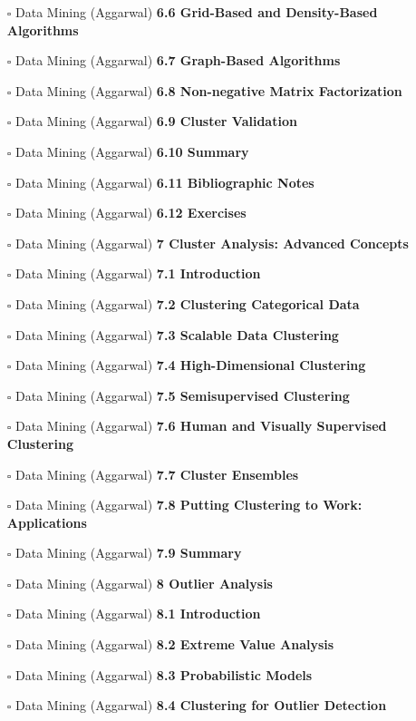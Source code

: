 \documentclass[a4, landscape, 12pt]{article}
\newcommand{\checkbox}{$\square$}%
\begin{document}
\begin{itemize}
{}
\item [\checkbox]  Data Mining (Aggarwal) \textbf{ 6.6 Grid-Based and Density-Based Algorithms
}
\item [\checkbox]  Data Mining (Aggarwal) \textbf{ 6.7 Graph-Based Algorithms
}
\item [\checkbox]  Data Mining (Aggarwal) \textbf{ 6.8 Non-negative Matrix Factorization
}
\item [\checkbox]  Data Mining (Aggarwal) \textbf{ 6.9 Cluster Validation
}
\item [\checkbox]  Data Mining (Aggarwal) \textbf{ 6.10 Summary
}
\item [\checkbox]  Data Mining (Aggarwal) \textbf{ 6.11 Bibliographic Notes
}
\item [\checkbox]  Data Mining (Aggarwal) \textbf{ 6.12 Exercises
}
\item [\checkbox]  Data Mining (Aggarwal) \textbf{ 7 Cluster Analysis: Advanced Concepts
}
\item [\checkbox]  Data Mining (Aggarwal) \textbf{ 7.1 Introduction
}
\item [\checkbox]  Data Mining (Aggarwal) \textbf{ 7.2 Clustering Categorical Data
}
\item [\checkbox]  Data Mining (Aggarwal) \textbf{ 7.3 Scalable Data Clustering
}
\item [\checkbox]  Data Mining (Aggarwal) \textbf{ 7.4 High-Dimensional Clustering
}
\item [\checkbox]  Data Mining (Aggarwal) \textbf{ 7.5 Semisupervised Clustering
}
\item [\checkbox]  Data Mining (Aggarwal) \textbf{ 7.6 Human and Visually Supervised Clustering
}
\item [\checkbox]  Data Mining (Aggarwal) \textbf{ 7.7 Cluster Ensembles
}
\item [\checkbox]  Data Mining (Aggarwal) \textbf{ 7.8 Putting Clustering to Work: Applications
}
\item [\checkbox]  Data Mining (Aggarwal) \textbf{ 7.9 Summary
}
\item [\checkbox]  Data Mining (Aggarwal) \textbf{ 8 Outlier Analysis
}
\item [\checkbox]  Data Mining (Aggarwal) \textbf{ 8.1 Introduction
}
\item [\checkbox]  Data Mining (Aggarwal) \textbf{ 8.2 Extreme Value Analysis
}
\item [\checkbox]  Data Mining (Aggarwal) \textbf{ 8.3 Probabilistic Models
}
\item [\checkbox]  Data Mining (Aggarwal) \textbf{ 8.4 Clustering for Outlier Detection
}
\end{itemize}
\end{document}
